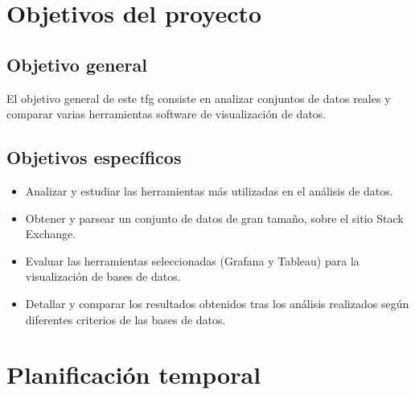 \documentclass[a4paper, 12pt]{book}
\begin{document}

\section{Objetivos del proyecto}
\label{sec:objetivos}

\subsection{Objetivo general} %
\label{sec:objetivo-general} %


El objetivo general de este \gls{tfg} consiste en analizar conjuntos de datos reales y comparar varias herramientas software de visualización de datos.

\subsection{Objetivos específicos}
\label{sec:objetivos-especificos}

    \begin{itemize}
        \item Analizar y estudiar las herramientas más utilizadas en el análisis de datos.
        \item Obtener y parsear un conjunto de datos de gran tamaño, sobre el sitio Stack Exchange.
        \item Evaluar las herramientas seleccionadas (Grafana y Tableau) para la visualización de bases de datos.
        \item Detallar y comparar los resultados obtenidos tras los análisis realizados según diferentes criterios de las bases de datos.
    \end{itemize}

\section{Planificación temporal}
\label{sec:planificacion-temporal}
\end{document}
